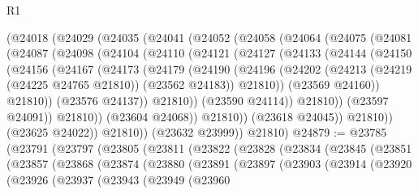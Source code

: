 \begin{lexlean}{R1}
\begin{coremodule}
    (@24018
      (@24029
        (@24035
          (@24041
            (@24052
              (@24058
                (@24064
                  (@24075
                    (@24081
                      (@24087
                        (@24098
                          (@24104
                            (@24110
                              (@24121
                                (@24127
                                  (@24133
                                    (@24144
                                      (@24150
                                        (@24156
                                          (@24167
                                            (@24173
                                              (@24179
                                                (@24190
                                                  (@24196
                                                    (@24202
                                                      (@24213
                                                        (@24219 (@24225 @24765 @21810))
                                                        (@23562 @24183))
                                                      @21810))
                                                  (@23569 @24160))
                                                @21810))
                                            (@23576 @24137))
                                          @21810))
                                      (@23590 @24114))
                                    @21810))
                                (@23597 @24091))
                              @21810))
                          (@23604 @24068))
                        @21810))
                    (@23618 @24045))
                  @21810))
              (@23625 @24022))
            @21810))
        (@23632 @23999))
      @21810)
@24879 := @23785
    (@23791
      (@23797
        (@23805
          (@23811
            (@23822
              (@23828
                (@23834
                  (@23845
                    (@23851
                      (@23857
                        (@23868
                          (@23874
                            (@23880
                              (@23891
                                (@23897
                                  (@23903
                                    (@23914
                                      (@23920
                                        (@23926
                                          (@23937
                                            (@23943
                                              (@23949
                                                (@23960

\end{coremodule}
\end{lexlean}
